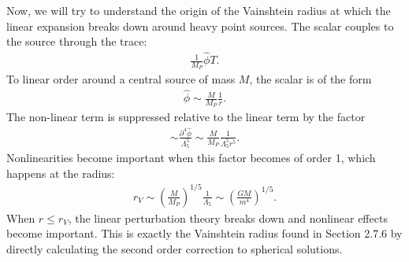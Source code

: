 \documentclass{book}
\theoremstyle{definition}
\newcommand{\p}{\partial}
\newcommand{\f}[2]{\frac{#1}{#2}}
\newcommand{\lp}{\left(}
\newcommand{\rp}{\right)}
\begin{document}
Now, we will try to understand the origin of the Vainshtein radius at which the linear expansion breaks down around heavy point sources. The scalar couples to the source through the trace:
\begin{align}
\f{1}{M_P}\hat\phi T.
\end{align}
To linear order around a central source of mass $M$, the scalar is of the form
\begin{align}
\hat\phi \sim \f{M}{M_P}\f{1}{r}.
\end{align}
The non-linear term is suppressed relative to the linear term by the factor
\begin{align}
\sim \f{\p^4\hat\phi}{\Lambda_5^5} \sim \f{M}{M_P}\f{1}{\Lambda_5^5 r^5}.
\end{align}
Nonlinearities become important when this factor becomes of order 1, which happens at the radius:
\begin{align}
r_V \sim \lp \f{M}{M_P} \rp^{1/5}\f{1}{\Lambda_5} \sim \lp \f{GM}{m^4} \rp^{1/5}.
\end{align}
When $r\leq r_V$, the linear perturbation theory breaks down and nonlinear effects become important. This is exactly the Vainshtein radius found in Section 2.7.6 by directly calculating the second order correction to spherical solutions. 
\end{document}
